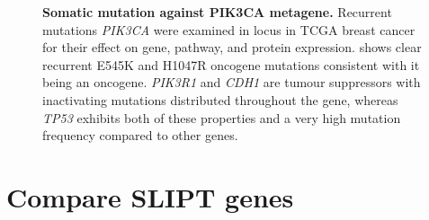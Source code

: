 \begin{figure}[!ht]
\begin{mdframed}
\begin{center}
    \end{center}
    \caption[Somatic mutation against PIK3CA metagene]{\small \textbf{Somatic mutation against PIK3CA metagene.} Recurrent mutations \textit{PIK3CA} were examined in locus in TCGA breast cancer for their effect on gene, pathway, and protein expression. shows clear recurrent E545K and H1047R oncogene mutations consistent with it being an oncogene. \textit{PIK3R1} and \textit{CDH1} are tumour suppressors with inactivating mutations distributed throughout the gene, whereas \textit{TP53} exhibits both of these properties and a very high mutation frequency compared to other genes.
}
\label{fig:mutation_expr_mg2}
\end{mdframed}
\end{figure}

\clearpage
\section{Compare SLIPT genes}

